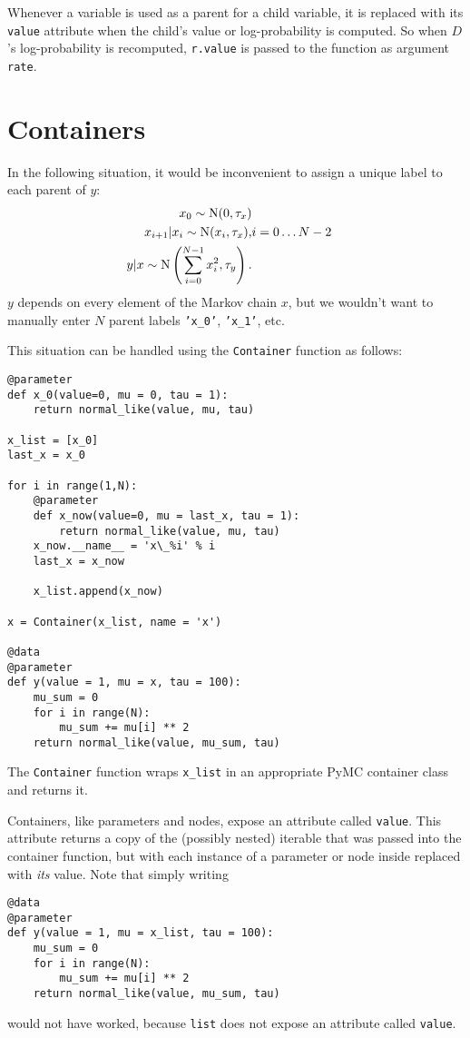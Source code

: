 Whenever a variable is used as a parent for a child variable, it is replaced with its \texttt{value} attribute when the child's value or log-probability is computed. So when $D$'s log-probability is recomputed, \texttt{r.value} is passed to the function as argument \texttt{rate}. 

\section{Containers}\label{sub:container}
In the following situation, it would be inconvenient to assign a unique label to each parent of $y$:
\begin{eqnarray*}
    x_0 \sim \textup N(0,\tau_x)\\
    x_{i+1}|x_i\sim\textup{N}(x_i, \tau_x),& i=0\ldots N-2\\
    y|x \sim \textup N\left(\sum_{i=0}^{N-1}x_i^2,\tau_y\right).
\end{eqnarray*}
$y$ depends on every element of the Markov chain $x$, but we wouldn't want to manually enter $N$ parent labels \texttt{'x_0'}, \texttt{'x\_1'}, etc.

This situation can be handled using the \texttt{Container} function as follows:
\begin{verbatim}
@parameter
def x_0(value=0, mu = 0, tau = 1):
    return normal_like(value, mu, tau)

x_list = [x_0]
last_x = x_0

for i in range(1,N):          
    @parameter
    def x_now(value=0, mu = last_x, tau = 1):
        return normal_like(value, mu, tau)
    x_now.__name__ = 'x\_%i' % i
    last_x = x_now
    
    x_list.append(x_now)
        
x = Container(x_list, name = 'x')

@data
@parameter
def y(value = 1, mu = x, tau = 100):
    mu_sum = 0
    for i in range(N):
        mu_sum += mu[i] ** 2
    return normal_like(value, mu_sum, tau)
\end{verbatim}
The \texttt{Container} function wraps \texttt{x\_list} in an appropriate PyMC container class and returns it.

Containers, like parameters and nodes, expose an attribute called \texttt{value}. This attribute returns a copy of the (possibly nested) iterable that was passed into the container function, but with each instance of a parameter or node inside replaced with \emph{its} value. Note that simply writing
\begin{verbatim}
@data
@parameter
def y(value = 1, mu = x_list, tau = 100):
    mu_sum = 0
    for i in range(N):
        mu_sum += mu[i] ** 2
    return normal_like(value, mu_sum, tau)
\end{verbatim}
would not have worked, because \texttt{list} does not expose an attribute called \texttt{value}. 

